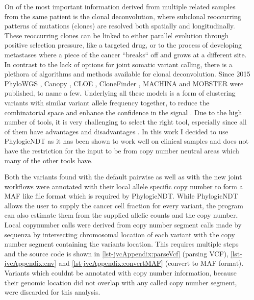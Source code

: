 On of the most important information derived from multiple related samples from the same patient is the clonal deconvolution, where subclonal reoccurring patterns of mutations (clones) are resolved both spatially and longitudinally. These reoccurring clones can be linked to either parallel evolution through positive selection pressure, like a targeted drug, or to the process of developing metastases where a piece of the cancer ``breaks`` off and grows at a different site.
In contrast to the lack of options for joint somatic variant calling, there is a plethora of algorithms and methods available for clonal deconvolution. Since 2015 PhyloWGS \cite{Deshwar2015}, Canopy \cite{Jiang2016}, CLOE \cite{Marass2016}, CloneFinder \cite{Miura2018}, MACHINA \cite{ElKebir2018} and MOBSTER \cite{Caravagna2020} were published, to name a few. Underlying all these models is a form of clustering variants with similar variant allele frequency together, to reduce the combinatorial space and enhance the confidence in the signal \cite{Tarabichi2021}. Due to the high number of tools, it is very challenging to select the right tool, especially since all of them have advantages and disadvantages \cite{Miura2020}. In this work I decided to use PhylogicNDT \cite{Leshchiner2018} as it has been shown to work well on clinical samples \cite{Gerstung2020} and does not have the restriction for the input to be from copy number neutral areas which many of the other tools have.


Both the variants found with the default pairwise as well as with the new joint workflows were annotated with their local allele specific copy number to form a MAF like file format which is required by PhylogicNDT. While PhylogicNDT allows the user to supply the cancer cell fraction for every variant, the program can also estimate them from the supplied allelic counts and the copy number. Local copynumber calls were derived from copy number segment calls made by sequenza by intersecting chromosomal location of each variant with the copy number segment containing the variants location. This requires multiple steps and the source code is shown in \autoref{lst-jvcAppendix:parseVcf} (parsing VCF), \autoref{lst-jvcAppendix:cnv} and \autoref{lst-jvcAppendix:convertMAF} (convert to MAF format). Variants which couldnt be annotated with copy number information, because their genomic location did not overlap with any called copy number segment, were discarded for this analysis.

